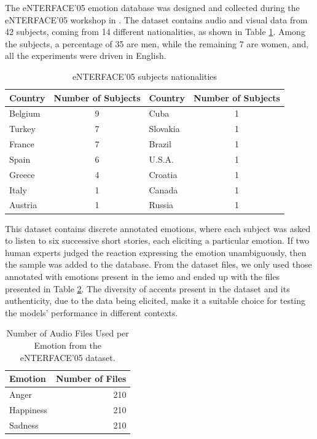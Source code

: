The eNTERFACE’05 emotion database \cite{Martin2006} was designed and collected during the eNTERFACE’05 workshop in \citeyear{Martin2006}. The dataset contains audio and visual data from 42 subjects, coming from 14 different nationalities, as shown in Table \ref{tab:enterfaceDiversity}. Among the subjects, a percentage of 35 are men, while the remaining 7 are women, and, all the experiments were driven in English.

\begin{table}[H]
	\centering
	\caption{eNTERFACE'05 subjects nationalities}
	\label{tab:enterfaceDiversity}
	\begin{tabular}{lc|lc}
		\toprule
		Country &Number of Subjects &Country &Number of Subjects\\
		\midrule
		Belgium & 9 & Cuba     & 1\\
		Turkey  & 7 & Slovakia & 1\\
		France  & 7 & Brazil   & 1\\
		Spain   & 6 & U.S.A.   & 1\\
		Greece  & 4 & Croatia  & 1\\
		Italy   & 1 & Canada   & 1\\
		Austria & 1 & Russia   & 1\\
		\bottomrule
	\end{tabular}
\end{table}


This dataset contains discrete annotated emotions, where each subject was asked to listen to six successive short stories, each eliciting a particular emotion. If two human experts judged the reaction expressing the emotion unambiguously, then the sample was added to the database.  From the dataset files, we only used those annotated with emotions present in the \ac{iemo} and ended up with the files presented in Table \ref{tab:ent_files}. The diversity of accents present in the dataset and its authenticity, due to the data being elicited, make it a suitable choice for testing the models' performance in different contexts.

\begin{table}[H]
	\centering
	\label{tab:ent_files}
	\caption{Number of Audio Files Used per Emotion from the eNTERFACE'05 dataset.}
	\begin{tabular}{lr}
		\toprule
		Emotion     &   Number of Files \\
		\midrule
		Anger      	&               210 \\
		Happiness 	&               210 \\
		Sadness    	&               210 \\
		\bottomrule
	\end{tabular}
\end{table}


